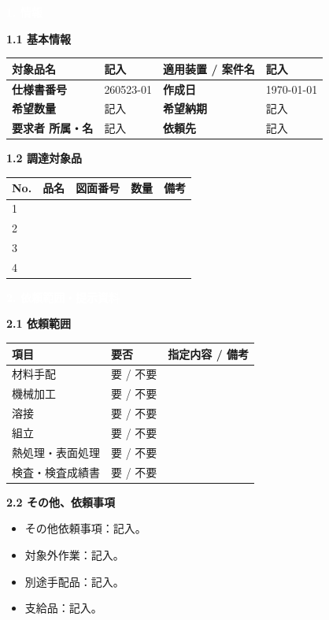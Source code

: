 \documentclass[a4paper,10pt]{ltjsarticle}
\makeatletter
\newlength{\SpecBodyWidth}
\newcommand{\SpecNo}{260523-01}
\newcommand{\SpecDate}{\today}
\newcommand{\ProjectName}{記入}
\newcommand{\PartName}{記入}
\newcommand{\Quantity}{記入}
\newcommand{\DueDate}{記入}
\newcommand{\PageTitle}[1]{%
  \vspace*{2mm}%
  \noindent\colorbox{SpecHead}{%
    \parbox{\dimexpr\SpecBodyWidth-2\fboxsep\relax}{%
      \large\bfseries\textcolor{white}{#1}%
    }%
  }%
  \par\vspace{5mm}%
}
\newcommand{\BlockTitle}[1]{%
  \vspace{4mm}%
  \noindent\colorbox{SpecSoft}{%
    \parbox{\dimexpr\SpecBodyWidth-2\fboxsep\relax}{%
      \normalsize\bfseries\textcolor{SpecHead}{#1}%
    }%
  }%
  \par\vspace{1.5mm}%
}
\newenvironment{SpecTable}[1]{%
  \par\vspace{1mm}%
  \noindent\footnotesize%
  \renewcommand{\arraystretch}{1.10}%
  \setlength{\tabcolsep}{3.0pt}%
  \begin{tabular*}{\SpecBodyWidth}{@{\extracolsep{\fill}}#1@{}}%
}{%
  \end{tabular*}%
  \par\vspace{1.5mm}%
}
\newcommand{\Head}[1]{\textbf{\textcolor{SpecHead}{#1}}}
\newcommand{\Lab}[1]{\textbf{\textcolor{SpecHead}{#1}}}
\newcommand{\YN}{要 / 不要}
\makeatother
\begin{document}

\PageTitle{1. 情報}

\BlockTitle{1.1 基本情報}
\begin{SpecTable}{|p{28mm}|p{43mm}|p{30mm}|p{43mm}|}
\hline
\Lab{対象品名} & \PartName & \Lab{適用装置 / 案件名} & \ProjectName \\
\hline
\Lab{仕様書番号} & \SpecNo & \Lab{作成日} & \SpecDate \\
\hline
\Lab{希望数量} & \Quantity & \Lab{希望納期} & \DueDate \\
\hline
\Lab{要求者 所属・名} & 記入 & \Lab{依頼先} & 記入 \\
\hline
\end{SpecTable}

\BlockTitle{1.2 調達対象品}
\begin{SpecTable}{|p{9mm}|p{52mm}|p{35mm}|p{16mm}|p{34mm}|}
\hline
\Head{No.} & \Head{品名} & \Head{図面番号} & \Head{数量} & \Head{備考} \\
\hline
1 &  &  &  &  \\
\hline
2 &  &  &  &  \\
\hline
3 &  &  &  &  \\
\hline
4 &  &  &  &  \\
\hline
\end{SpecTable}


\clearpage

\PageTitle{2. 依頼範囲・提示資料}

\BlockTitle{2.1 依頼範囲}
\begin{SpecTable}{|p{36mm}|p{24mm}|p{86mm}|}
\hline
\Head{項目} & \Head{要否} & \Head{指定内容 / 備考} \\
\hline
材料手配 & \YN &  \\
\hline
機械加工 & \YN &  \\
\hline
溶接 & \YN &  \\
\hline
組立 & \YN &  \\
\hline
熱処理・表面処理 & \YN &  \\
\hline
検査・検査成績書 & \YN &  \\
\hline
\end{SpecTable}

\BlockTitle{2.2 その他、依頼事項}
\begin{itemize}
  \item その他依頼事項：記入。
  \item 対象外作業：記入。
  \item 別途手配品：記入。
  \item 支給品：記入。
\end{itemize}
\end{document}
